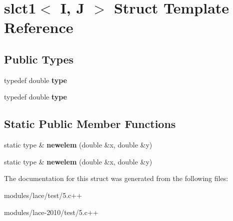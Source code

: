 \hypertarget{structslct1}{\section{slct1$<$ I, J $>$ Struct Template Reference}
\label{structslct1}
}
\subsection*{Public Types}
\begin{DoxyCompactItemize}
\item 
\hypertarget{structslct1_a9247a00842f008b9b252baabfa3bf6c4}{typedef double {\bfseries type}}\label{structslct1_a9247a00842f008b9b252baabfa3bf6c4}

\item 
\hypertarget{structslct1_a9247a00842f008b9b252baabfa3bf6c4}{typedef double {\bfseries type}}\label{structslct1_a9247a00842f008b9b252baabfa3bf6c4}

\end{DoxyCompactItemize}
\subsection*{Static Public Member Functions}
\begin{DoxyCompactItemize}
\item 
\hypertarget{structslct1_a580b70569133e0b8e4f4466e1f97c880}{static type \& {\bfseries newelem} (double \&x, double \&y)}\label{structslct1_a580b70569133e0b8e4f4466e1f97c880}

\item 
\hypertarget{structslct1_a580b70569133e0b8e4f4466e1f97c880}{static type \& {\bfseries newelem} (double \&x, double \&y)}\label{structslct1_a580b70569133e0b8e4f4466e1f97c880}

\end{DoxyCompactItemize}


The documentation for this struct was generated from the following files\-:\begin{DoxyCompactItemize}
\item 
modules/lace/test/5.\-c++\item 
modules/lace-\/2010/test/5.\-c++\end{DoxyCompactItemize}
